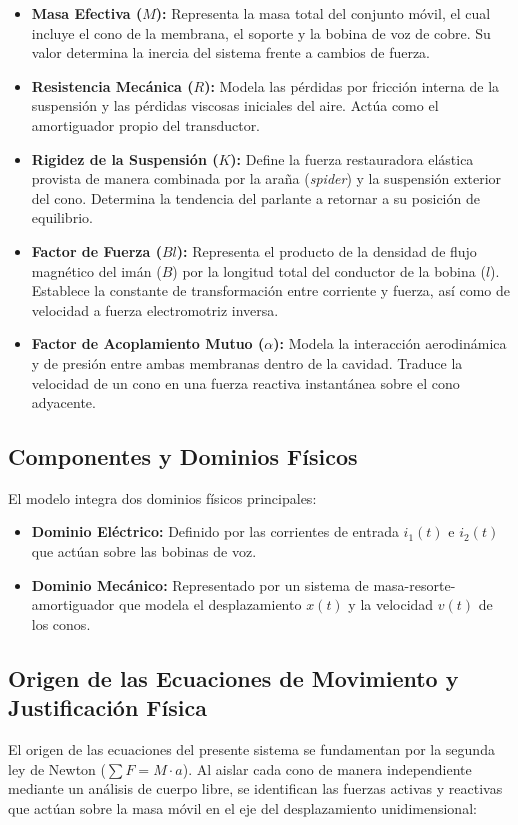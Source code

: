 \documentclass[journal]{IEEEtran}
\begin{document}
\begin{itemize}
    \item \textbf{Masa Efectiva ($M$):} Representa la masa total del conjunto móvil, el cual incluye el cono de la membrana, el soporte y la bobina de voz de cobre. Su valor determina la inercia del sistema frente a cambios de fuerza.
    
    \item \textbf{Resistencia Mecánica ($R$):} Modela las pérdidas por fricción interna de la suspensión y las pérdidas viscosas iniciales del aire. Actúa como el amortiguador propio del transductor.

    \item \textbf{Rigidez de la Suspensión ($K$):} Define la fuerza restauradora elástica provista de manera combinada por la araña (\textit{spider}) y la suspensión exterior del cono. Determina la tendencia del parlante a retornar a su posición de equilibrio.
    
    \item \textbf{Factor de Fuerza ($Bl$):} Representa el producto de la densidad de flujo magnético del imán ($B$) por la longitud total del conductor de la bobina ($l$). Establece la constante de transformación entre corriente y fuerza, así como de velocidad a fuerza electromotriz inversa.
    
    \item \textbf{Factor de Acoplamiento Mutuo ($\alpha$):} Modela la interacción aerodinámica y de presión entre ambas membranas dentro de la cavidad. Traduce la velocidad de un cono en una fuerza reactiva instantánea sobre el cono adyacente.
\end{itemize}

\subsection{Componentes y Dominios Físicos}
El modelo integra dos dominios físicos principales:
\begin{itemize}
    \item \textbf{Dominio Eléctrico:} Definido por las corrientes de entrada $i_1(t)$ e $i_2(t)$ que actúan sobre las bobinas de voz.
    
    \item \textbf{Dominio Mecánico:} Representado por un sistema de masa-resorte-amortiguador que modela el desplazamiento $x(t)$ y la velocidad $v(t)$ de los conos.
\end{itemize}

\subsection{Origen de las Ecuaciones de Movimiento y Justificación Física}
El origen de las ecuaciones del presente sistema se fundamentan por la segunda ley de Newton ($\sum F = M \cdot a$). Al aislar cada cono de manera independiente mediante un análisis de cuerpo libre, se identifican las fuerzas activas y reactivas que actúan sobre la masa móvil en el eje del desplazamiento unidimensional:
\end{document}
